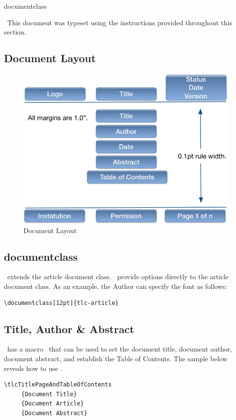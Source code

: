 documentclass\documentclass[12pt]{tlc-article}
\begin{document}
\tlcNote\ This document was typeset using the instructions provided throughout
this section.

\subsection{Document Layout}
\begin{figure}[h]
  \centering
  \includegraphics{images/titlepage.png}
  \caption{Document Layout}
  \label{fig:layout}
\end{figure}
\subsection{documentclass \tlcA}
\tlcA\ extends the article document class.  \tlcA\ provide options directly to
the article document class.  As an example, the Author can specify the font as
follows:

\begin{lstlisting}[basicstyle=\tiny]
  \documentclass[12pt]{tlc-article}
\end{lstlisting}

\subsection{Title, Author \& Abstract} \label{sec:TAA}
\tlcA\ has a macro \tlcTOC\ that can be used to set the document title, document
author, document abstract, and establish the Table of Contents.  The sample
below reveals how to use \tlcTOC.

\begin{lstlisting}[basicstyle=\tiny]
  \tlcTitlePageAndTableOfContents
     {Document Title}
     {Document Article}
     {Document Abstract}
\end{lstlisting}
\end{document}
